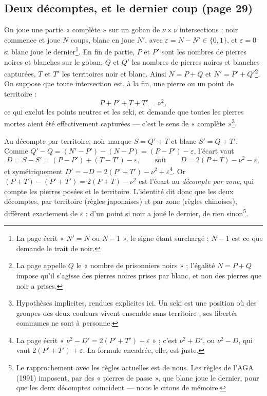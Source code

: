 \documentclass[11pt,a4paper]{article}
\begin{document}
\subsection*{Deux décomptes, et le dernier coup (page 29)}

On joue une partie « complète » sur un goban de $\nu \times \nu$
intersections ; noir commence et joue $N$ coups, blanc en joue $N'$, avec
$\varepsilon = N - N' \in \{0, 1\}$, et $\varepsilon = 0$ si blanc joue le
dernier\footnote{La page écrit « $N' = N$ ou $N - 1$ », le signe étant
surchargé ; $N - 1$ est ce que demande le trait de noir.}. En fin de
partie, $P$ et $P'$ sont les nombres de pierres noires et blanches sur le
goban, $Q$ et $Q'$ les nombres de pierres noires et blanches capturées,
$T$ et $T'$ les territoires noir et blanc. Ainsi $N = P + Q$ et
$N' = P' + Q'$\footnote{La page appelle $Q$ le « nombre de prisonniers
noirs » ; l'égalité $N = P + Q$ impose qu'il s'agisse des pierres noires
prises par blanc, et non des pierres que noir a prises.}. On suppose que
toute intersection est, à la fin, une pierre ou un point de territoire :
\[
P + P' + T + T' = \nu^{2},
\]
ce qui exclut les points neutres et les seki, et demande que toutes les
pierres mortes aient été effectivement capturées — c'est le sens de
« complète »\footnote{Hypothèses implicites, rendues explicites ici. Un
seki est une position où des groupes des deux couleurs vivent ensemble sans
territoire ; ses libertés communes ne sont à personne.}.

Au décompte par territoire, noir marque $S = Q' + T$ et blanc
$S' = Q + T'$. Comme $Q' - Q = (N' - P') - (N - P) = (P - P') - \varepsilon$,
l'écart vaut
\[
D = S - S' = (P - P') + (T - T') - \varepsilon, \qquad \text{soit} \qquad
D = 2(P + T) - \nu^{2} - \varepsilon ,
\]
et symétriquement $D' = -D = 2(P' + T') - \nu^{2} + \varepsilon$\footnote{La
page écrit « $\nu^{2} - D' = 2(P' + T') + \varepsilon$ » ; c'est
$\nu^{2} + D'$, ou $\nu^{2} - D$, qui vaut $2(P' + T') + \varepsilon$. La
formule encadrée, elle, est juste.}. Or $(P + T) - (P' + T') = 2(P + T) -
\nu^{2}$ est l'écart au \emph{décompte par zone}, qui compte les pierres
posées et le territoire. L'identité dit donc que les deux décomptes, par
territoire (règles japonaises) et par zone (règles chinoises), diffèrent
exactement de $\varepsilon$ : d'un point si noir a joué le dernier, de rien
sinon\footnote{Le rapprochement avec les règles actuelles est de nous. Les
règles de l'AGA (1991) imposent, par des « pierres de passe », que blanc
joue le dernier, pour que les deux décomptes coïncident — nous le citons de
mémoire.}.
\end{document}
